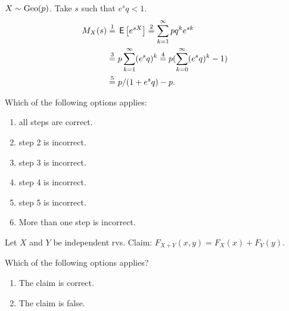 \documentclass[poll_tutorial_format]{subfiles}
\begin{document}
\begin{exercise}
$X\sim \mathrm{Geo}(p)$. Take $s$ such that $e^{s}q < 1$.
\begin{align}
\label{eq:5}
M_{X}(s)
  &\stackrel{1}= \,\mathsf{E}\left[e^{sX}\right] \stackrel{2}= \sum_{k=1}^{\infty} p q^{k} e^{sk} \\
  &\stackrel{3}= p \sum_{k=1}^{\infty} (e^{s}q)^{k}
  \stackrel{4}= p (\sum_{k=0}^{\infty} (e^{s}q)^{k}-1) \\
&  \stackrel{5}= p /(1+e^{s}q)  - p.
\end{align}

\vspace{0.5cm}\noindent  Which of the following options applies:
\begin{enumerate}
\item all steps are correct.
\item step 2 is incorrect.
\item step 3 is incorrect.
\item step 4 is incorrect.
\item step 5 is incorrect.
\item More than one step is incorrect.
\end{enumerate}
\end{exercise}

\begin{exercise}
Let $X$ and $Y$ be independent rvs. Claim: $F_{X+Y}(x, y) = F_X(x) + F_{Y}(y)$.

\vspace{0.5cm}\noindent  Which of the following options applies?
\begin{enumerate}
\item The claim is correct.
\item The claim is false.
\end{enumerate}
\end{exercise}
\end{document}

